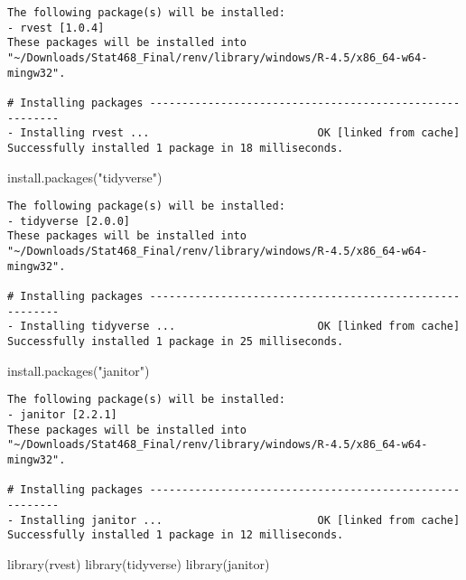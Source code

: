 \documentclass[
  letterpaper,
  DIV=11,
  numbers=noendperiod]{scrreprt}
\newenvironment{Shaded}{\begin{snugshade}}{\end{snugshade}}
\newcommand{\FunctionTok}[1]{\textcolor[rgb]{0.28,0.35,0.67}{#1}}
\newcommand{\NormalTok}[1]{\textcolor[rgb]{0.00,0.23,0.31}{#1}}
\newcommand{\StringTok}[1]{\textcolor[rgb]{0.13,0.47,0.30}{#1}}
\begin{document}
\begin{verbatim}
The following package(s) will be installed:
- rvest [1.0.4]
These packages will be installed into "~/Downloads/Stat468_Final/renv/library/windows/R-4.5/x86_64-w64-mingw32".

# Installing packages --------------------------------------------------------
- Installing rvest ...                          OK [linked from cache]
Successfully installed 1 package in 18 milliseconds.
\end{verbatim}

\begin{Shaded}
\begin{Highlighting}[]
\FunctionTok{install.packages}\NormalTok{(}\StringTok{"tidyverse"}\NormalTok{)}
\end{Highlighting}
\end{Shaded}

\begin{verbatim}
The following package(s) will be installed:
- tidyverse [2.0.0]
These packages will be installed into "~/Downloads/Stat468_Final/renv/library/windows/R-4.5/x86_64-w64-mingw32".

# Installing packages --------------------------------------------------------
- Installing tidyverse ...                      OK [linked from cache]
Successfully installed 1 package in 25 milliseconds.
\end{verbatim}

\begin{Shaded}
\begin{Highlighting}[]
\FunctionTok{install.packages}\NormalTok{(}\StringTok{"janitor"}\NormalTok{)}
\end{Highlighting}
\end{Shaded}

\begin{verbatim}
The following package(s) will be installed:
- janitor [2.2.1]
These packages will be installed into "~/Downloads/Stat468_Final/renv/library/windows/R-4.5/x86_64-w64-mingw32".

# Installing packages --------------------------------------------------------
- Installing janitor ...                        OK [linked from cache]
Successfully installed 1 package in 12 milliseconds.
\end{verbatim}

\begin{Shaded}
\begin{Highlighting}[]
\FunctionTok{library}\NormalTok{(rvest)}
\FunctionTok{library}\NormalTok{(tidyverse)}
\FunctionTok{library}\NormalTok{(janitor)}
\end{Highlighting}
\end{Shaded}
\end{document}
